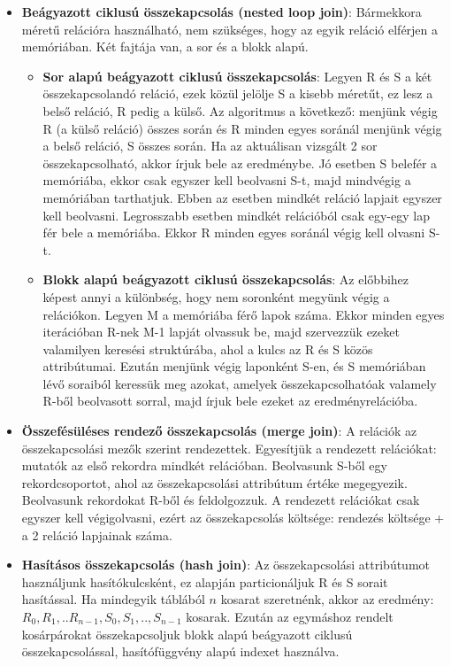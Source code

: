 \documentclass[margin=0px]{article}
\begin{document}
\begin{itemize}
    \item	\textbf{Beágyazott ciklusú összekapcsolás (nested loop join)}: Bármekkora méretű relációra használható, nem szükséges, hogy
          az egyik reláció elférjen a memóriában. Két fajtája van, a sor és a blokk alapú.
          \begin{itemize}
              \item	\textbf{Sor alapú beágyazott ciklusú összekapcsolás}: Legyen R és S a két összekapcsolandó reláció, ezek közül jelölje
                    S a kisebb méretűt, ez lesz a belső reláció, R pedig a külső. Az algoritmus a következő: menjünk végig R (a külső reláció)
                    összes során és R minden egyes soránál menjünk végig a belső reláció, S összes során. Ha az aktuálisan vizsgált 2 sor összekapcsolható, akkor írjuk bele az eredménybe. Jó esetben S belefér a memóriába, ekkor csak egyszer kell beolvasni S-t,
                    majd mindvégig a memóriában tarthatjuk. Ebben az esetben mindkét reláció lapjait egyszer kell beolvasni. Legrosszabb
                    esetben mindkét relációból csak egy-egy lap fér bele a memóriába. Ekkor R minden egyes soránál végig kell olvasni S-t.

              \item	\textbf{Blokk alapú beágyazott ciklusú összekapcsolás}: Az előbbihez képest annyi a különbség, hogy nem soronként
                    megyünk végig a relációkon. Legyen M a memóriába férő lapok száma. Ekkor minden egyes iterációban R-nek M-1 lapját olvassuk
                    be, majd szervezzük ezeket valamilyen keresési struktúrába, ahol a kulcs az R és S közös attribútumai. Ezután menjünk
                    végig laponként S-en, és S memóriában lévő soraiból keressük meg azokat, amelyek összekapcsolhatóak valamely R-ből
                    beolvasott sorral, majd írjuk bele ezeket az eredményrelációba.
          \end{itemize}

    \item	\textbf{Összefésüléses rendező összekapcsolás (merge join)}: A relációk az összekapcsolási mezők szerint rendezettek.
          Egyesítjük a rendezett relációkat: mutatók az első rekordra mindkét relációban. Beolvasunk S-ből egy rekordcsoportot, ahol az összekapcsolási attribútum értéke megegyezik. Beolvasunk rekordokat R-ből és feldolgozzuk. A rendezett relációkat
          csak egyszer kell végigolvasni, ezért az összekapcsolás költsége: rendezés költsége + a 2 reláció lapjainak száma.

    \item	\textbf{Hasításos összekapcsolás (hash join)}: Az összekapcsolási attribútumot használjunk hasítókulcsként, ez alapján
          particionáljuk R és S sorait hasítással. Ha mindegyik táblából $n$ kosarat szeretnénk, akkor az eredmény: $R_{0},R_{1},..R_{n-1}, S_{0},S_{1},..,S_{n-1}$ kosarak. Ezután az egymáshoz rendelt kosárpárokat összekapcsoljuk blokk alapú beágyazott ciklusú
          összekapcsolással, hasítófüggvény alapú indexet használva.
\end{itemize}
\end{document}
